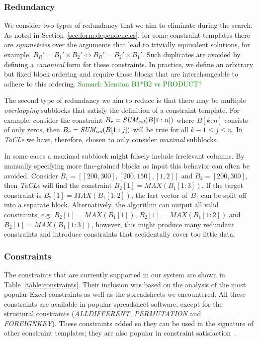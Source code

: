 \documentclass{IEEEtran}
\newcommand{\samuel}[1]{\textcolor{green}{{\sc Samuel:} #1}\xspace}
\newcommand{\format}[1]{\textit{#1}\xspace}
\newcommand{\sname}{\format{TaCLe}}
\newcommand{\eccalc}[2]{\ensuremath{#1 = #2}}
\newcommand{\ecprod}[3]{\eccalc{#1}{#2 \times #3}}
\newcommand{\ecsumc}[2]{\eccalc{#1}{\textit{SUM\textsubscript{col}}(#2)}}
\theoremstyle{definition}
\begin{document}
\subsubsection{Redundancy}
We consider two types of redundancy that we aim to eliminate during the search.
As noted in Section~\ref{sec:form:dependencies}, for some constraint templates there are \textit{symmetries} over the arguments that lead to trivially equivalent solutions, for example, $\ecprod{B_R'}{B_1'}{B_2'} \Leftrightarrow \ecprod{B_R'}{B_2'}{B_1'}$.
Such duplicates are avoided by defining a \textit{canonical} form for these constraints.
In practice, we define an arbitrary but fixed block ordering and require those blocks that are interchangeable to adhere to this ordering.
\samuel{Mention B1*B2 vs PRODUCT?}

The second type of redundancy we aim to reduce is that there may be multiple \textit{overlapping} subblocks that satisfy the definition of a constraint template.
For example, consider the constraint \ecsumc{B_r}{B[1:n]} where $B[k:n]$ consists of only zeros, then \ecsumc{B_r}{B[1:j]} will be true for all $k - 1 \leq j \leq n$.
In \sname we have, therefore, chosen to only consider \textit{maximal} subblocks.

In some cases a maximal subblock might falsely include irrelevant columns.
By manually specifying more fine-grained blocks as input this behavior can often be avoided.
Consider $B_1 = [[200, 300], [200, 150], [1, 2]]$ and $B_2 = [200, 300]$, then \sname will find the constraint $\eccalc{B_2[1]}{\mathit{MAX}(B_1[1:3])}$.
If the target constraint is $\eccalc{B_2[1]}{\mathit{MAX}(B_1[1:2])}$, the last vector of~$B_1$ can be split off into a separate block.
Alternatively, the algorithm can output all valid constraints, e.g. $\eccalc{B_2[1]}{\mathit{MAX}(B_1[1])}$, $\eccalc{B_2[1]}{\mathit{MAX}(B_1[1:2])}$ and $\eccalc{B_2[1]}{\mathit{MAX}(B_1[1:3])}$, however, this might produce many redundant constraints and introduce constraints that accidentally cover too little data.





\subsubsection{Constraints}
The constraints that are currently supported in our system are shown in Table~\ref{table:constraints}.
Their inclusion was based on the analysis of the most popular Excel constraints as well as the spreadsheets we encountered.
All these constraints are available in popular spreadsheet software, except for the structural constraints (\textit{ALLDIFFERENT}, \textit{PERMUTATION} and \textit{FOREIGNKEY}).
These constraints added so they can be used in the signature of other constraint templates; they are also popular in constraint satisfaction~\cite{modelseeker}.
\end{document}
